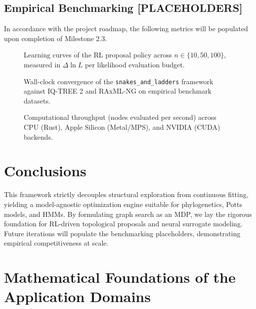 \documentclass[11pt,a4paper]{article}
\begin{document}
\subsection{Empirical Benchmarking [PLACEHOLDERS]}

In accordance with the project roadmap, the following metrics will be populated upon completion of Milestone 2.3.

\begin{figure}[htbp]
  \centering
  \caption{Learning curves of the RL proposal policy across $n \in \{10, 50, 100\}$, measured in $\Delta \ln L$ per likelihood evaluation budget.}
  \label{fig:rl-convergence}
\end{figure}

\begin{figure}[htbp]
  \centering
  \caption{Wall-clock convergence of the \texttt{snakes\_and\_ladders} framework against IQ-TREE 2 and RAxML-NG on empirical benchmark datasets.}
  \label{fig:benchmark-iqtree}
\end{figure}

\begin{figure}[htbp]
  \centering
  \caption{Computational throughput (nodes evaluated per second) across CPU (Rust), Apple Silicon (Metal/MPS), and NVIDIA (CUDA) backends.}
  \label{fig:hardware-scaling}
\end{figure}

\section{Conclusions}
\label{sec:conclusions}

This framework strictly decouples structural exploration from continuous fitting, yielding a model-agnostic optimization engine suitable for phylogenetics, Potts models, and HMMs. By formulating graph search as an MDP, we lay the rigorous foundation for RL-driven topological proposals and neural surrogate modeling. Future iterations will populate the benchmarking placeholders, demonstrating empirical competitiveness at scale.




\appendix

\section{Mathematical Foundations of the Application Domains}
\label{app:background}
\end{document}
